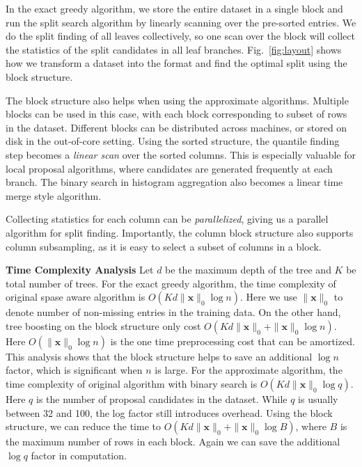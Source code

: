 In the exact greedy algorithm, we store the entire dataset in a single block and run the split search algorithm by linearly scanning over the pre-sorted entries. We do the split finding of all leaves collectively, so one scan over the block will collect the statistics of the split candidates in all leaf branches. Fig.~\ref{fig:layout} shows how we transform a dataset into the format and find the optimal split using the block structure.

The block structure also helps when using the approximate algorithms. Multiple blocks can be used in this case, with each block corresponding to subset of rows in the dataset. Different blocks can be distributed across machines, or stored on disk in the out-of-core setting. Using the sorted structure, the quantile finding step becomes a \emph{linear scan} over the sorted columns. This is especially valuable for local proposal algorithms, where candidates are generated frequently at each branch. The binary search in histogram aggregation also becomes  a linear time merge style algorithm.

Collecting statistics for each column can be \emph{parallelized}, giving us a parallel algorithm for split finding. Importantly, the column block structure also supports column subsampling, as it is easy to select a subset of columns in a block.

 \textbf{Time Complexity Analysis} Let $d$ be the maximum depth of the tree and $K$ be total number of trees. For the exact greedy algorithm, the time complexity of original spase aware algorithm is $O(K d \|\mathbf{x}\|_0 \log n)$. Here we use $\|\mathbf{x}\|_0$ to denote number of non-missing entries in the training data. On the other hand, tree boosting on the block structure only cost $O(K d \|\mathbf{x}\|_0 + \|\mathbf{x}\|_0 \log n)$. Here $O( \|\mathbf{x}\|_0 \log n)$ is the one time preprocessing cost that can be amortized. This analysis shows that the block structure helps to save an additional $\log n$ factor, which is significant when $n$ is large. For the approximate algorithm, the time complexity of original algorithm with binary search is $O(K d \|\mathbf{x}\|_0 \log q)$. Here $q$ is the number of proposal candidates in the dataset. While $q$ is usually between 32 and 100, the log factor still introduces overhead. Using the block structure, we can reduce the time to $O(K d \|\mathbf{x}\|_0 + \|\mathbf{x}\|_0 \log B)$, where $B$ is the maximum number of rows in each block. Again we can save the additional $\log q$ factor in computation.

